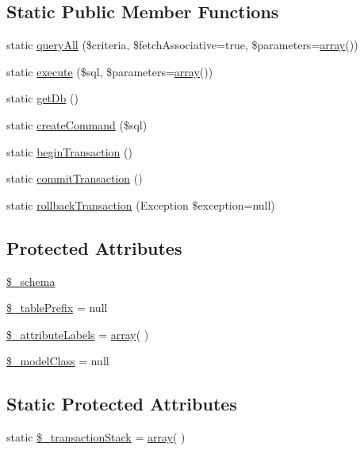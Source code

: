 \subsection*{Static Public Member Functions}
\begin{DoxyCompactItemize}
\item 
static \hyperlink{classCPSModel_a804031428d96cfe7a18b1a343272f5a7}{queryAll} (\$criteria, \$fetchAssociative=true, \$parameters=\hyperlink{list_8php_aa3205d038c7f8feb5c9f01ac4dfadc88}{array}())
\item 
static \hyperlink{classCPSModel_adeb67d458cbd5d7845bd2b47bc5e2905}{execute} (\$sql, \$parameters=\hyperlink{list_8php_aa3205d038c7f8feb5c9f01ac4dfadc88}{array}())
\item 
static \hyperlink{classCPSModel_a994ac6292d92ce6c172ee2f655b91ae4}{getDb} ()
\item 
static \hyperlink{classCPSModel_a146675932a41d9bcf4194237aa1d68db}{createCommand} (\$sql)
\item 
static \hyperlink{classCPSModel_acede846ed83753b53f6b99ad1c4df87c}{beginTransaction} ()
\item 
static \hyperlink{classCPSModel_a46020c73ffd9df1dab08fcfc7a26d530}{commitTransaction} ()
\item 
static \hyperlink{classCPSModel_a06996eae1b742263c0a4b83da0f9f922}{rollbackTransaction} (Exception \$exception=null)
\end{DoxyCompactItemize}
\subsection*{Protected Attributes}
\begin{DoxyCompactItemize}
\item 
\hyperlink{classCPSModel_ad86f0aac1c5254c623bf3a6683ed56e8}{\$\_\-schema}
\item 
\hyperlink{classCPSModel_a58d5dd151fa6e7f7841d9d85a6a6c273}{\$\_\-tablePrefix} = null
\item 
\hyperlink{classCPSModel_a255288ecbb9d5f910b8d9a7c04a34a9b}{\$\_\-attributeLabels} = \hyperlink{list_8php_aa3205d038c7f8feb5c9f01ac4dfadc88}{array}( )
\item 
\hyperlink{classCPSModel_a90080dcb26627bf719d96ab99e51f958}{\$\_\-modelClass} = null
\end{DoxyCompactItemize}
\subsection*{Static Protected Attributes}
\begin{DoxyCompactItemize}
\item 
static \hyperlink{classCPSModel_a3cff4c1c690782176edb1e27b4d602a1}{\$\_\-transactionStack} = \hyperlink{list_8php_aa3205d038c7f8feb5c9f01ac4dfadc88}{array}( )
\end{DoxyCompactItemize}


